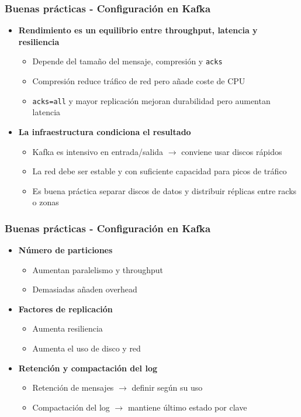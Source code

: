 \documentclass[aspectratio=169]{beamer}
\begin{document}
\begin{frame}
\frametitle{Buenas prácticas - Configuración en Kafka}
\begin{itemize}
  \item \textbf{Rendimiento es un equilibrio entre throughput, latencia y resiliencia}
  \begin{itemize}
    \item Depende del tamaño del mensaje, compresión y \texttt{acks}
    \item Compresión reduce tráfico de red pero añade coste de CPU
    \item \texttt{acks=all} y mayor replicación mejoran durabilidad pero aumentan latencia
  \end{itemize}

  \vspace{1em}

  \item \textbf{La infraestructura condiciona el resultado}
  \begin{itemize}
    \item Kafka es intensivo en entrada/salida $\rightarrow$ conviene usar discos rápidos
    \item La red debe ser estable y con suficiente capacidad para picos de tráfico
    \item Es buena práctica separar discos de datos y distribuir réplicas entre racks o zonas
  \end{itemize}
\end{itemize}
\end{frame}


\begin{frame}\frametitle{Buenas prácticas - Configuración en Kafka}
\begin{itemize}
  \item \textbf{Número de particiones}
  \begin{itemize}
    \item Aumentan paralelismo y throughput
    \item Demasiadas añaden overhead
  \end{itemize}

  \vspace{1em}

  \item \textbf{Factores de replicación}
  \begin{itemize}
    \item Aumenta resiliencia
    \item Aumenta el uso de disco y red
  \end{itemize}

  \vspace{1em}

  \item \textbf{Retención y compactación del log}
  \begin{itemize}
    \item Retención de mensajes $\rightarrow$ definir según su uso
    \item Compactación del log $\rightarrow$ mantiene último estado por clave
  \end{itemize}
\end{itemize}
\end{frame}
\end{document}

